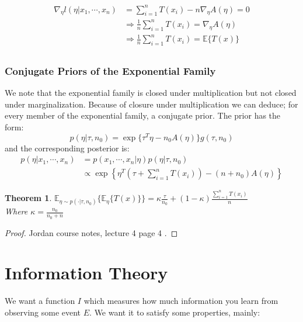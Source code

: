 \documentclass[]{article}
\theoremstyle{mattstyle}
\newtheorem{theorem}{Theorem}[section]
\theoremstyle{definition}
\begin{document}
\begin{align*}
\nabla_{\eta} l(\eta| x_1, \cdots, x_n) &= \sum_{i=1}^nT(x_i) - n\nabla_{\eta} A(\eta) = 0\\
&\Rightarrow \frac{1}{n}\sum_{i=1}^nT(x_i) = \nabla_{\eta}A(\eta)\\
&\Rightarrow \frac{1}{n}\sum_{i=1}^nT(x_i) = \mathbb{E}\{T(x)\}\\
\end{align*} 

\subsubsection{Conjugate Priors of the Exponential Family}

We note that the exponential family is closed under multiplication but not closed under marginalization. Because of closure under multiplication we can deduce; for every member of the exponential family, a conjugate prior. The prior has the form:
$$ p(\eta | \tau, n_0) = \exp\{ \tau^T\eta - n_0A(\eta)\}g(\tau,n_0)$$  
and the corresponding posterior is:
\begin{align*}
p( \eta | x_1, \cdots, x_n) &= p(x_1, \cdots, x_n | \eta)p(\eta| \tau, n_0)\\
&\propto\exp\left\{\eta^T\left(\tau + \sum_{i=1}^nT(x_i)\right) - (n + n_0)A(\eta)\right\}
\end{align*}
\begin{theorem}
	$\mathbb{E}_{\eta \sim p(\cdot| \tau, n_0)}\{\mathbb{E}_{\eta}\{ T(x)\}\} = \kappa \frac{\tau}{n_0} + (1-\kappa)\frac{\sum_{i=1}^nT(x_i)}{n}$\\
	Where $\kappa = \frac{n_0}{n_0 + n}$
\end{theorem}
\begin{proof}
	Jordan course notes, lecture 4 page 4 \cite{MJordanNotes}.
\end{proof}

\newpage

\section{Information Theory}

We want a function $I$ which measures how much information you learn from observing some event $E$. We want it to satisfy some properties, mainly:
\end{document}
